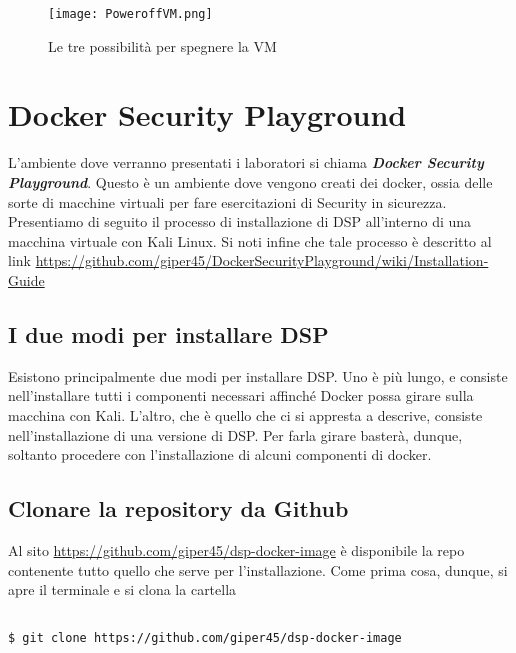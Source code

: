 \documentclass[14pt]{extreport}
\begin{document}
\begin{figure}[H]
    \centering
    \texttt{[image: PoweroffVM.png]}
    \caption{Le tre possibilità per spegnere la VM}
    \label{PowerOffVM}
\end{figure}


\section{Docker Security Playground}
L'ambiente dove verranno presentati i laboratori si chiama \textbf{\textit{Docker Security Playground}}. Questo è un ambiente dove vengono creati dei docker, ossia delle sorte di macchine virtuali per fare esercitazioni di Security in sicurezza. Presentiamo di seguito il processo di installazione di DSP all'interno di una macchina virtuale con Kali Linux. Si noti infine che tale processo è descritto al link \url{https://github.com/giper45/DockerSecurityPlayground/wiki/Installation-Guide}


\subsection{I due modi per installare DSP}
Esistono principalmente due modi per installare DSP. Uno è più lungo, e consiste nell'installare tutti i componenti necessari affinché Docker possa girare sulla macchina con Kali. L'altro, che è quello che ci si appresta a descrive, consiste nell'installazione di una versione  di DSP. Per farla girare basterà, dunque, soltanto procedere con l'installazione di alcuni componenti di docker.





\subsection{Clonare la repository da Github}
Al sito \url{https://github.com/giper45/dsp-docker-image} è disponibile la repo contenente tutto quello che serve per l'installazione. Come prima cosa, dunque, si apre il terminale e si clona la cartella

\vspace{10pt}
{
\small
\begin{tcolorbox}

\begin{verbatim}

$ git clone https://github.com/giper45/dsp-docker-image
  
\end{verbatim}

\end{tcolorbox}
}
\vspace{18pt}
\end{document}
